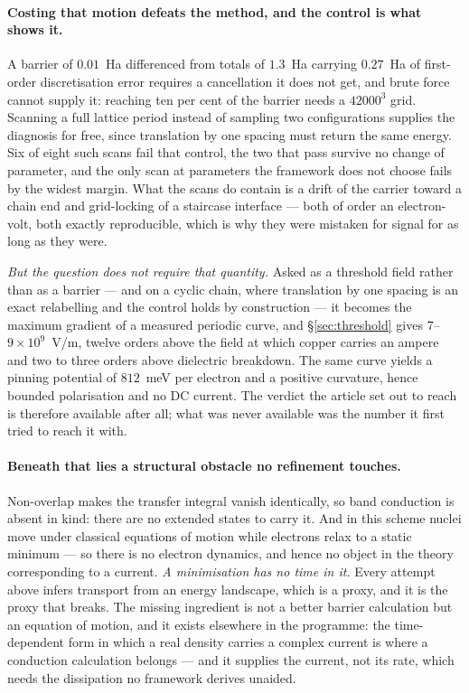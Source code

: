 \documentclass[11pt]{article}
\begin{document}
\paragraph{Costing that motion defeats the method, and the control is what shows it.} A barrier of
$0.01$~Ha differenced from totals of $1.3$~Ha carrying $0.27$~Ha of first-order discretisation error
requires a cancellation it does not get, and brute force cannot supply it: reaching ten per cent of
the barrier needs a $42000^3$ grid. Scanning a full lattice period instead of sampling two
configurations supplies the diagnosis for free, since translation by one spacing must return the
same energy. Six of eight such scans fail that control, the two that pass survive no change of
parameter, and the only scan at parameters the framework does not choose fails by the widest margin.
What the scans do contain is a drift of the carrier toward a chain end and grid-locking of a
staircase interface --- both of order an electron-volt, both exactly reproducible, which is why they
were mistaken for signal for as long as they were.

\emph{But the question does not require that quantity.} Asked as a threshold field rather than as a
barrier --- and on a cyclic chain, where translation by one spacing is an exact relabelling and the
control holds by construction --- it becomes the maximum gradient of a measured periodic curve, and
\S\ref{sec:threshold} gives $7$--$9\times10^{9}$~V/m, twelve orders above the field at which copper
carries an ampere and two to three orders above dielectric breakdown. The same curve yields a
pinning potential of $812$~meV per electron and a positive curvature, hence bounded polarisation and
no DC current. The verdict the article set out to reach is therefore available after all; what was
never available was the number it first tried to reach it with.

\paragraph{Beneath that lies a structural obstacle no refinement touches.} Non-overlap makes the
transfer integral vanish identically, so band conduction is absent in kind: there are no extended
states to carry it. And in this scheme nuclei move under classical equations of motion while
electrons relax to a static minimum --- so there is no electron dynamics, and hence no object in the
theory corresponding to a current. \emph{A minimisation has no time in it.} Every attempt above
infers transport from an energy landscape, which is a proxy, and it is the proxy that breaks. The
missing ingredient is not a better barrier calculation but an equation of motion, and it exists
elsewhere in the programme: the time-dependent form in which a real density carries a complex
current is where a conduction calculation belongs --- and it supplies the current, not its rate,
which needs the dissipation no framework derives unaided.
\end{document}
